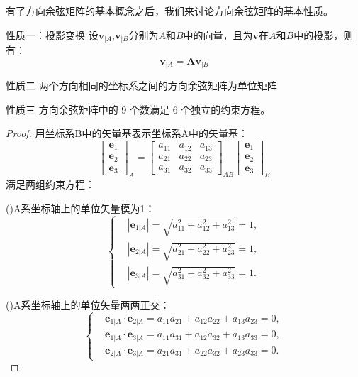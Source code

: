 有了方向余弦矩阵的基本概念之后，我们来讨论方向余弦矩阵的基本性质。
\begin{myTheorem}{性质一：投影变换}
    设$\mathbf{v}_{|A}$,$\mathbf{v}_{|B}$分别为$A$和$B$中的向量，且为$\mathbf{v}$在$A$和$B$中的投影，则有：
$$\mathbf{v}_{|A}=\bm{A}\mathbf{v}_{|B}$$

\end{myTheorem}

\begin{myTheorem}{性质二}
    两个方向相同的坐标系之间的方向余弦矩阵为单位矩阵
\end{myTheorem}

\begin{myTheorem}{性质三}
    方向余弦矩阵中的 9 个数满足 6 个独立的约束方程。
\end{myTheorem}
\begin{proof}
    用坐标系B中的矢量基表示坐标系A中的矢量基：
     $$\begin{bmatrix}\bm{e}_{1}\\\bm{e}_{2}\\\bm{e}_{3}\end{bmatrix}_A=\begin{bmatrix}a_{11}&a_{12}&a_{13}\\a_{21}&a_{22}&a_{23}\\a_{31}&a_{32}&a_{33}\end{bmatrix}_{AB}\begin{bmatrix}\bm{e}_{1}\\\bm{e}_{2}\\\bm{e}_{3}\end{bmatrix}_B$$
     满足两组约束方程：

     (\uppercase\expandafter{})A系坐标轴上的单位矢量模为1：$$\begin{cases}&|\bm{e}_{1|A}|=\sqrt{a_{11}^2+a_{12}^2+a_{13}^2}=1,\\&|\bm{e}_{2|A}|=\sqrt{a_{21}^2+a_{22}^2+a_{23}^2}=1,\\&|\bm{e}_{3|A}|=\sqrt{a_{31}^2+a_{32}^2+a_{33}^2}=1.\end{cases}$$


     (\uppercase\expandafter{})A系坐标轴上的单位矢量两两正交：$$\begin{cases}&\bm{e}_{1|A}\cdot\bm{e}_{2|A}=a_{11}a_{21}+a_{12}a_{22}+a_{13}a_{23}=0,\\&\bm{e}_{1|A}\cdot\bm{e}_{3|A}=a_{11}a_{31}+a_{12}a_{32}+a_{13}a_{33}=0,\\&\bm{e}_{2|A}\cdot\bm{e}_{3|A}=a_{21}a_{31}+a_{22}a_{32}+a_{23}a_{33}=0.\end{cases}$$


\end{proof}
